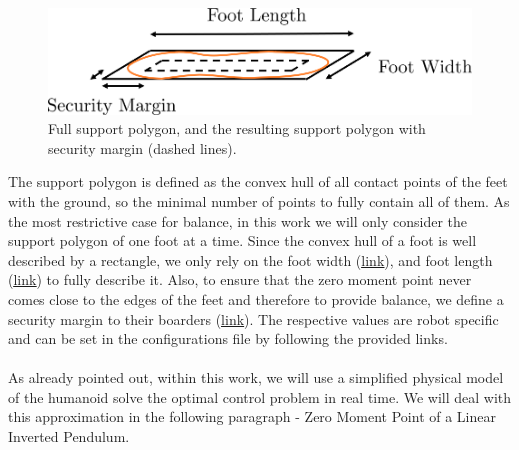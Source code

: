 \begin{figure}[h!]
	\centering
	\includegraphics[scale=.5]{chapters/02_background/img/support_polygon.png}
	\caption{Full support polygon, and the resulting support polygon with security margin (dashed lines).}
	\label{fig::211_support_polygon}
\end{figure}
The support polygon is defined as the convex hull of all contact points of the feet with the ground, so the minimal number of points to fully contain all of them. As the most restrictive case for balance, in this work we will only consider the support polygon of one foot at a time. Since the convex hull of a foot is well described by a rectangle, we only rely on the foot width (\href{https://github.com/mhubii/nmpc_pattern_generator/blob/bc79a6d4f9bcfd3794146355af44429f5b7a9fe0/libs/pattern_generator/configs.yaml#L14}{\underline{link}}), and foot length (\href{https://github.com/mhubii/nmpc_pattern_generator/blob/bc79a6d4f9bcfd3794146355af44429f5b7a9fe0/libs/pattern_generator/configs.yaml#L15}{\underline{link}}) to fully describe it. Also, to ensure that the zero moment point never comes close to the edges of the feet and therefore to provide balance, we define a security margin to their boarders (\href{https://github.com/mhubii/nmpc_pattern_generator/blob/bc79a6d4f9bcfd3794146355af44429f5b7a9fe0/libs/pattern_generator/configs.yaml#L3}{\underline{link}}). The respective values are robot specific and can be set in the configurations file by following the provided links.
\\\\
As already pointed out, within this work, we will use a simplified physical model of the humanoid solve the optimal control problem in real time. We will deal with this approximation in the following paragraph - Zero Moment Point of a Linear Inverted Pendulum.
\FloatBarrier
